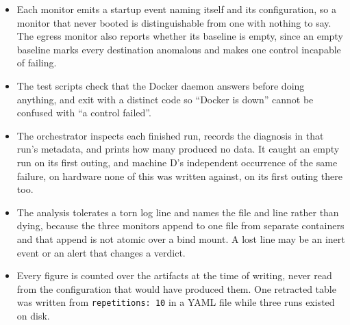 \begin{itemize}
\item Each monitor emits a startup event naming itself and its configuration,
      so a monitor that never booted is distinguishable from one with nothing
      to say. The egress monitor also reports whether its baseline is empty,
      since an empty baseline marks every destination anomalous and makes one
      control incapable of failing.
\item The test scripts check that the Docker daemon answers before doing
      anything, and exit with a distinct code so ``Docker is down'' cannot be
      confused with ``a control failed''.
\item The orchestrator inspects each finished run, records the diagnosis in
      that run's metadata, and prints how many produced no data. It caught an
      empty run on its first outing, and machine D's independent occurrence
      of the same failure, on hardware none of this was written against, on
      its first outing there too.
\item The analysis tolerates a torn log line and names the file and line
      rather than dying, because the three monitors append to one file from
      separate containers and that append is not atomic over a bind mount.
      A lost line may be an inert event or an alert that changes a verdict.
\item Every figure is counted over the artifacts at the time of writing, never
      read from the configuration that would have produced them. One retracted
      table was written from \texttt{repetitions: 10} in a YAML file while
      three runs existed on disk.
\end{itemize}
